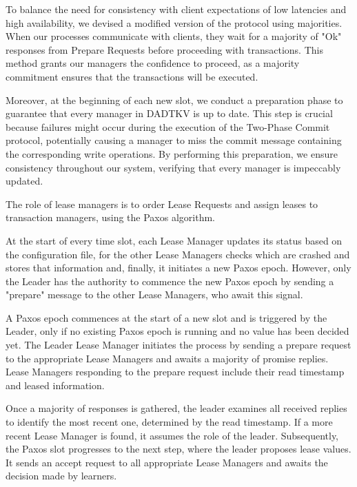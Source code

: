 \documentclass[times, 10pt,twocolumn]{article}
\begin{document}
To balance the need for consistency with client expectations of 
low latencies and high availability, we devised a modified version
of the protocol using majorities. When our processes communicate 
with clients, they wait for a majority of "Ok" responses from Prepare 
Requests before proceeding with transactions. This method grants our
managers the confidence to proceed, as a majority commitment ensures 
that the transactions will be executed.

Moreover, at the beginning of each new slot, we conduct a preparation 
phase to guarantee that every manager in DADTKV is up to date. This 
step is crucial because failures might occur during the execution 
of the Two-Phase Commit protocol, potentially causing a manager 
to miss the commit message containing the corresponding write 
operations. By performing this preparation, we ensure consistency 
throughout our system, verifying that every manager is impeccably updated.



The role of lease managers is to order Lease Requests and assign 
leases to transaction managers, using the Paxos algorithm. 

At the start of every time slot, each Lease Manager updates its 
status based on the configuration file, for the other Lease Managers 
checks which are crashed and stores that information and, finally, 
it initiates a new Paxos epoch. However, only the Leader has the 
authority to commence the new Paxos epoch by sending a "prepare"
message to the other Lease Managers, who await this signal.

A Paxos epoch commences at the start of a new slot and is triggered 
by the Leader, only if no existing Paxos epoch is running and no 
value has been decided yet. The Leader Lease Manager initiates 
the process by sending a prepare request to the appropriate Lease 
Managers and awaits a majority of promise replies. Lease Managers 
responding to the prepare request include their read timestamp and 
leased information.

Once a majority of responses is gathered, the leader examines all 
received replies to identify the most recent one, determined by the 
read timestamp. If a more recent Lease Manager is found, it assumes 
the role of the leader. Subsequently, the Paxos slot progresses to 
the next step, where the leader proposes lease values. It sends an 
accept request to all appropriate Lease Managers and awaits the decision 
made by learners.
\end{document}
